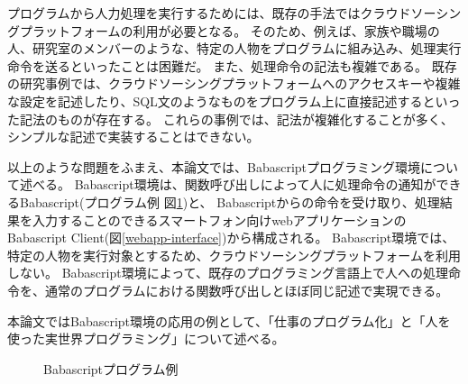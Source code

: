 \documentclass[twoside]{wiss}
\begin{document}
プログラムから人力処理を実行するためには、既存の手法ではクラウドソーシングプラットフォームの利用が必要となる。
そのため、例えば、家族や職場の人、研究室のメンバーのような、特定の人物をプログラムに組み込み、処理実行命令を送るといったことは困難だ。
また、処理命令の記法も複雑である。
既存の研究事例では、クラウドソーシングプラットフォームへのアクセスキーや複雑な設定を記述したり、SQL文のようなものをプログラム上に直接記述するといった記法のものが存在する。
これらの事例では、記法が複雑化することが多く、シンプルな記述で実装することはできない。

以上のような問題をふまえ、本論文では、Babascriptプログラミング環境について述べる。
Babascript環境は、関数呼び出しによって人に処理命令の通知ができるBabascript(プログラム例 図\ref{script_01})と、
Babascriptからの命令を受け取り、処理結果を入力することのできるスマートフォン向けwebアプリケーションのBabascript Client(図\ref{webapp-interface})から構成される。
Babascript環境では、特定の人物を実行対象とするため、クラウドソーシングプラットフォームを利用しない。
Babascript環境によって、既存のプログラミング言語上で人への処理命令を、通常のプログラムにおける関数呼び出しとほぼ同じ記述で実現できる。

本論文ではBabascript環境の応用の例として、「仕事のプログラム化」と「人を使った実世界プログラミング」について述べる。


\begin{figure}[!h]  
  \centering
  \caption{Babascriptプログラム例}
  \label{script_01}
\end{figure}
\end{document}

